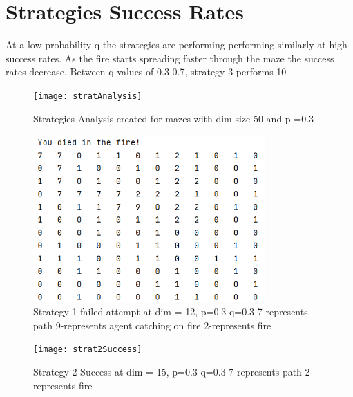 \documentclass{article}
\begin{document}
\bigskip
\bigskip
\bigskip
\bigskip
\bigskip
\bigskip
\bigskip
\bigskip

\section{Strategies Success Rates}
At a low probability q the strategies are performing performing similarly at high success rates. As the fire starts spreading faster through the maze the success rates decrease. Between q values of 0.3-0.7, strategy 3 performs 10%
  
\begin{figure}[hbt!]
   \centering
\texttt{[image: stratAnalysis]}

\caption{Strategies Analysis created for mazes with dim size 50 and p =0.3}
\label{fig:figure7}
\end{figure}

\begin{figure}[hbt!]
   \centering
\includegraphics[width=3.5in]{strat1fail}

\caption{Strategy 1 failed attempt at dim = 12, p=0.3 q=0.3 7-represents path 9-represents agent catching on fire 2-represents fire}
\label{fig:figure8}
\end{figure}

\begin{figure}[hbt!]
   \centering
\texttt{[image: strat2Success]}

\caption{Strategy 2 Success at dim = 15, p=0.3 q=0.3 7 represents path 2-represents fire}
\label{fig:figure9}
\end{figure}
\end{document}
